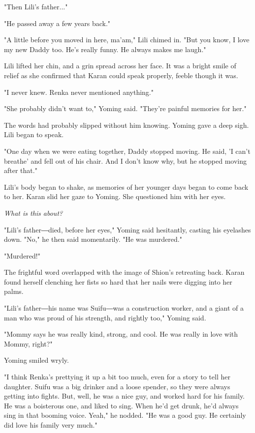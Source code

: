 "Then Lili's father..."

"He passed away a few years back."

"A little before you moved in here, ma'am," Lili chimed in. "But you
know, I love my new Daddy too. He's really funny. He always makes me
laugh."

Lili lifted her chin, and a grin spread across her face. It was a bright
smile of relief as she confirmed that Karan could speak properly, feeble
though it was.

"I never knew. Renka never mentioned anything."

"She probably didn't want to," Yoming said. "They're painful memories
for her."

The words had probably slipped without him knowing. Yoming gave a deep
sigh. Lili began to speak.

"One day when we were eating together, Daddy stopped moving. He said, 'I
can't breathe' and fell out of his chair. And I don't know why, but he
stopped moving after that."

Lili's body began to shake, as memories of her younger days began to
come back to her. Karan slid her gaze to Yoming. She questioned him with
her eyes.

\emph{What is this about?}

"Lili's father―died, before her eyes," Yoming said hesitantly, casting
his eyelashes down. "No," he then said momentarily. "He was murdered."

"Murdered!"

The frightful word overlapped with the image of Shion's retreating back.
Karan found herself clenching her fists so hard that her nails were
digging into her palms.

"Lili's father―his name was Suifu―was a construction worker, and a giant
of a man who was proud of his strength, and rightly too," Yoming said.

"Mommy says he was really kind, strong, and cool. He was really in love
with Mommy, right?"

Yoming smiled wryly.

"I think Renka's prettying it up a bit too much, even for a story to
tell her daughter. Suifu was a big drinker and a loose spender, so they
were always getting into fights. But, well, he was a nice guy, and
worked hard for his family. He was a boisterous one, and liked to sing.
When he'd get drunk, he'd always sing in that booming voice. Yeah," he
nodded. "He was a good guy. He certainly did love his family very much."

